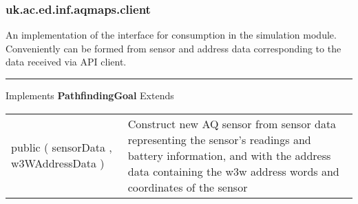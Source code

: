 \subsubsection*{ uk.ac.ed.inf.aqmaps.client }
 {\scriptsize An implementation of the \hyperref[tab:Sensor]{\color{blue}{Sensor}} interface for consumption in the simulation module. Conveniently can be formed from sensor and address data \newline%
 corresponding to the data received via API client.
 
\vspace*{4pt} \hrule \vspace*{3pt}
Implements \textbf{ PathfindingGoal }
Extends \textbf{ \hyperref[tab:Sensor]{\color{blue}{Sensor}} }
\vspace*{-5pt} 
\begin{tabularx}{\linewidth}{m{}|m{}}
\label{tab:AQSensor}
\begin{raggedleft}public  \textbf{\hyperref[tab:AQSensor]{\color{blue}{AQSensor}} }(\newline \hfill 
\hspace*{ 5pt} \textbf{\hyperref[tab:SensorData]{\color{blue}{SensorData}}} sensorData , \newline
 \hspace*{ 5pt} \textbf{\hyperref[tab:W3WAddressData]{\color{blue}{W3WAddressData}}} w3WAddressData  )
\end{raggedleft} &
 Construct new AQ sensor from sensor data representing the sensor's readings and battery information, and with the address data containing \newline%
 the w3w address words and coordinates of the sensor\\\end{tabularx}
}
